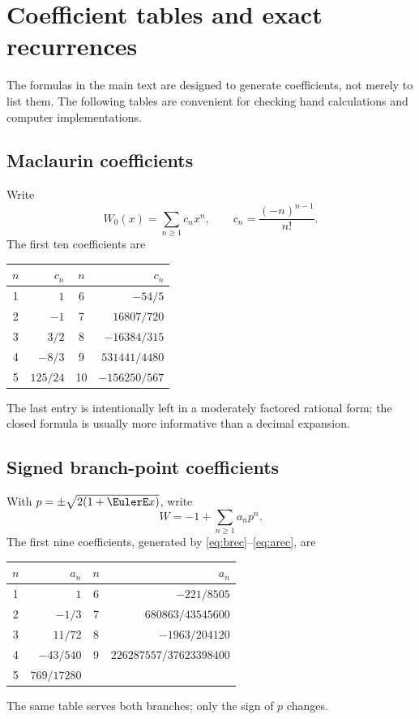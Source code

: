 \documentclass[11pt]{article}
\theoremstyle{remark}
\begin{document}
\section{Coefficient tables and exact recurrences}\label{app:coefficients}

The formulas in the main text are designed to generate coefficients, not
merely to list them.  The following tables are convenient for checking hand
calculations and computer implementations.

\subsection{Maclaurin coefficients}

Write
\[
       W_0(x)=\sum_{n\geq1}c_nx^n,
       \qquad c_n=\frac{(-n)^{n-1}}{n!}.
\]
The first ten coefficients are
\begin{center}
\begin{tabular}{@{}c r@{\qquad}c r@{}}
\toprule
\(n\)&\(c_n\)&\(n\)&\(c_n\)\\
\midrule
1&\(1\)&6&\(-54/5\)\\
2&\(-1\)&7&\(16807/720\)\\
3&\(3/2\)&8&\(-16384/315\)\\
4&\(-8/3\)&9&\(531441/4480\)\\
5&\(125/24\)&10&\(-156250/567\)\\
\bottomrule
\end{tabular}
\end{center}
The last entry is intentionally left in a moderately factored rational form;
the closed formula is usually more informative than a decimal expansion.

\subsection{Signed branch-point coefficients}

With \(p=\pm\sqrt{2(1+\EulerE x)}\), write
\[
       W=-1+\sum_{n\geq1}a_np^n.
\]
The first nine coefficients, generated by
\eqref{eq:brec}--\eqref{eq:arec}, are
\begin{center}
\begin{tabular}{@{}c r@{\qquad}c r@{}}
\toprule
\(n\)&\(a_n\)&\(n\)&\(a_n\)\\
\midrule
1&\(1\)&6&\(-221/8505\)\\
2&\(-1/3\)&7&\(680863/43545600\)\\
3&\(11/72\)&8&\(-1963/204120\)\\
4&\(-43/540\)&9&\(226287557/37623398400\)\\
5&\(769/17280\)&&\\
\bottomrule
\end{tabular}
\end{center}
The same table serves both branches; only the sign of \(p\) changes.
\end{document}
